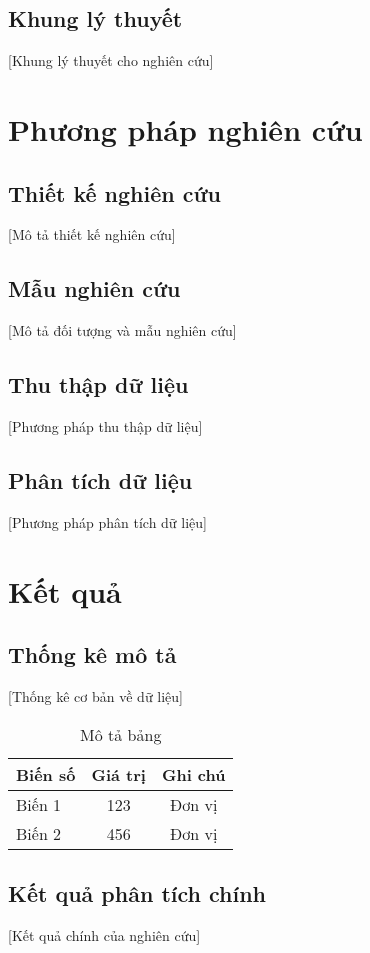 \documentclass[12pt,a4paper]{article}
\begin{document}
\subsection{Khung lý thuyết}
[Khung lý thuyết cho nghiên cứu]

\section{Phương pháp nghiên cứu}

\subsection{Thiết kế nghiên cứu}
[Mô tả thiết kế nghiên cứu]

\subsection{Mẫu nghiên cứu}
[Mô tả đối tượng và mẫu nghiên cứu]

\subsection{Thu thập dữ liệu}
[Phương pháp thu thập dữ liệu]

\subsection{Phân tích dữ liệu}
[Phương pháp phân tích dữ liệu]

\section{Kết quả}

\subsection{Thống kê mô tả}
[Thống kê cơ bản về dữ liệu]

\begin{table}[h]
\centering
\caption{Mô tả bảng}
\label{tab:example}
\begin{tabular}{|l|c|c|}
\hline
Biến số & Giá trị & Ghi chú \\
\hline
Biến 1 & 123 & Đơn vị \\
Biến 2 & 456 & Đơn vị \\
\hline
\end{tabular}
\end{table}

\subsection{Kết quả phân tích chính}
[Kết quả chính của nghiên cứu]
\end{document}
